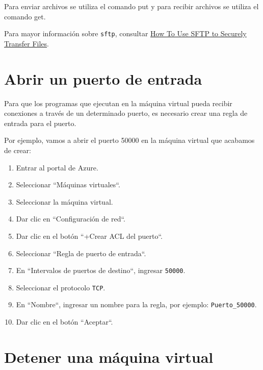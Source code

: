 Para enviar archivos se utiliza el comando put y para recibir archivos se utiliza el comando get.

Para mayor información sobre \texttt{sftp}, consultar \href{https://www.digitalocean.com/community/tutorials/how-to-use-sftp-to-securely-transfer-files-with-a-remote-server-es}{How To Use SFTP to Securely Transfer Files}.

\section{Abrir un puerto de entrada}

Para que los programas que ejecutan en la máquina virtual pueda recibir conexiones a través de un determinado puerto, es necesario crear una regla de entrada para el puerto.

Por ejemplo, vamos a abrir el puerto 50000 en la máquina virtual que acabamos de crear:

\begin{enumerate}

\item Entrar al portal de Azure.

\item Seleccionar ``Máquinas virtuales``.

\item Seleccionar la máquina virtual.

\item Dar clic en ``Configuración de red``.

\item Dar clic en el botón ``+Crear ACL del puerto``.

\item Seleccionar ``Regla de puerto de entrada``.

\item En ``Intervalos de puertos de destino``, ingresar \texttt{50000}.

\item Seleccionar el protocolo \texttt{TCP}.

\item En ``Nombre``, ingresar un nombre para la regla, por ejemplo: \texttt{Puerto\_50000}.

\item Dar clic en el botón ``Aceptar``.

\end{enumerate}

\section{Detener una máquina virtual}

